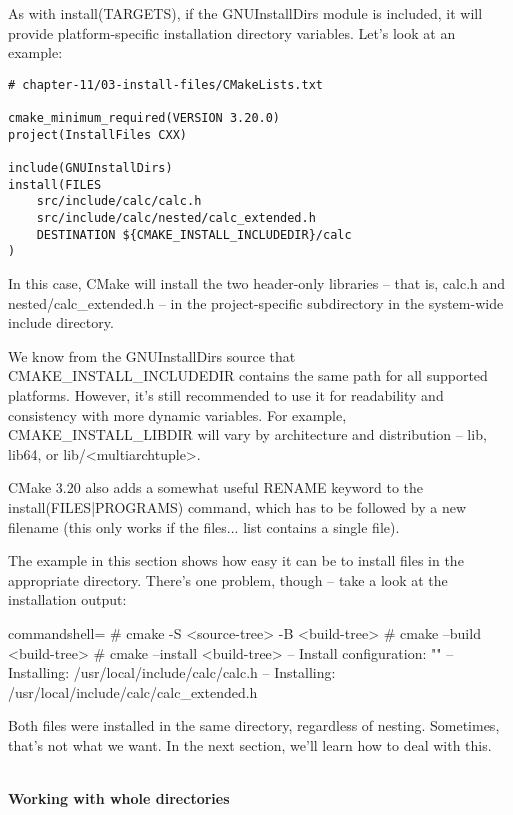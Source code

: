 As with install(TARGETS), if the GNUInstallDirs module is included, it will provide platform-specific installation directory variables. Let's look at an example:

\begin{lstlisting}[style=styleCMake]
# chapter-11/03-install-files/CMakeLists.txt

cmake_minimum_required(VERSION 3.20.0)
project(InstallFiles CXX)

include(GNUInstallDirs)
install(FILES
	src/include/calc/calc.h
	src/include/calc/nested/calc_extended.h
	DESTINATION ${CMAKE_INSTALL_INCLUDEDIR}/calc
)
\end{lstlisting}

In this case, CMake will install the two header-only libraries – that is, calc.h and nested/calc\_extended.h – in the project-specific subdirectory in the system-wide include directory.

\begin{tcolorbox}[colback=blue!5!white,colframe=blue!75!black,title=Note]
We know from the GNUInstallDirs source that CMAKE\_INSTALL\_INCLUDEDIR contains the same path for all supported platforms. However, it's still recommended to use it for readability and consistency with more dynamic variables. For example, CMAKE\_INSTALL\_LIBDIR will vary by architecture and distribution – lib, lib64, or lib/<multiarchtuple>.
\end{tcolorbox}

CMake 3.20 also adds a somewhat useful RENAME keyword to the install(FILES|PROGRAMS) command, which has to be followed by a new filename (this only works if the files... list contains a single file).

The example in this section shows how easy it can be to install files in the appropriate directory. There's one problem, though – take a look at the installation output:

\begin{tcblisting}{commandshell={}}
# cmake -S <source-tree> -B <build-tree>
# cmake --build <build-tree>
# cmake --install <build-tree>
-- Install configuration: ""
-- Installing: /usr/local/include/calc/calc.h
-- Installing: /usr/local/include/calc/calc_extended.h
\end{tcblisting}

Both files were installed in the same directory, regardless of nesting. Sometimes, that's not what we want. In the next section, we'll learn how to deal with this.


\hspace*{\fill} \\ %
\noindent
\textbf{Working with whole directories}

